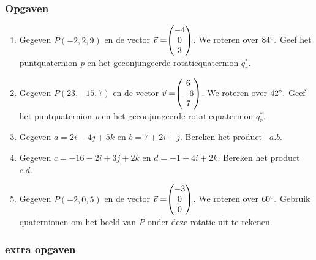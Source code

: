\subsubsection{Opgaven}
\begin{enumerate}
	\item Gegeven $ P (-2, 2, 9) $ en de vector $\vec{v} = \vecdrie{-4}{0}{3} $. 
	We roteren over $ 84\degree. $ Geef het puntquaternion \textit{p} en het geconjungeerde rotatiequaternion  $  q_r^* $.
	\item Gegeven $ P (23, -15, 7) $ en de vector $\vec{v} = \vecdrie{6}{-6}{7} $. 
	We roteren over $ 42\degree. $ Geef het puntquaternion \textit{p} en het geconjungeerde rotatiequaternion  $  q_r^* $.
	
	\item Gegeven $ a = 2i-4j+5k$ en   $ b = 7+2i+j $. 
	Bereken het product \ $  a.b $.
	\item Gegeven $ c = -16 -2i+3j+2k $ en   $ d = -1+4i+2k $. 
	Bereken het product \ $  c.d $.
	
	\item Gegeven $ P (-2, 0, 5) $ en de vector $\vec{v} = \vecdrie{-3}{0}{0} $. 
	We roteren over $ 60\degree. $ Gebruik quaternionen om het beeld van \textit{P }onder deze rotatie uit te rekenen.
	
\end{enumerate}

\subsubsection{extra opgaven}

